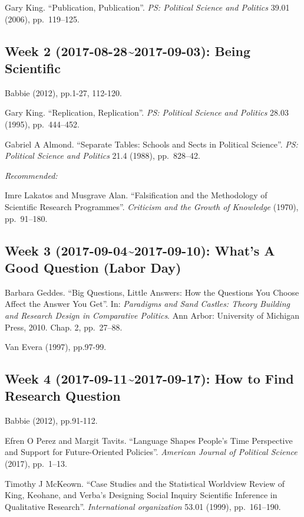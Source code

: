 \documentclass[11pt,]{article}
\begin{document}
Gary King. ``Publication, Publication''.
\emph{PS: Political Science and Politics} 39.01 (2006), pp.~119--125.

\subsection{Week 2 (2017-08-28\textasciitilde{}2017-09-03): Being
Scientific}\label{week-2-2017-08-282017-09-03-being-scientific}

Babbie (2012), pp.1-27, 112-120.

Gary King. ``Replication, Replication''.
\emph{PS: Political Science and Politics} 28.03 (1995), pp.~444--452.

Gabriel A Almond. ``Separate Tables: Schools and Sects in Political
Science''. \emph{PS: Political Science and Politics} 21.4 (1988),
pp.~828--42.

\emph{Recommended:}

Imre Lakatos and Musgrave Alan. ``Falsification and the Methodology of
Scientific Research Programmes''.
\emph{Criticism and the Growth of Knowledge} (1970), pp.~91--180.

\subsection{Week 3 (2017-09-04\textasciitilde{}2017-09-10): What's A
Good Question (Labor
Day)}\label{week-3-2017-09-042017-09-10-whats-a-good-question-labor-day}

Barbara Geddes. ``Big Questions, Little Answers: How the Questions You
Choose Affect the Answer You Get''. In:
\emph{Paradigms and Sand Castles: Theory Building and Research Design in Comparative Politics}.
Ann Arbor: University of Michigan Press, 2010. Chap. 2, pp.~27--88.

Van Evera (1997), pp.97-99.

\subsection{Week 4 (2017-09-11\textasciitilde{}2017-09-17): How to Find
Research
Question}\label{week-4-2017-09-112017-09-17-how-to-find-research-question}

Babbie (2012), pp.91-112.

Efren O Perez and Margit Tavits. ``Language Shapes People's Time
Perspective and Support for Future-Oriented Policies''.
\emph{American Journal of Political Science} (2017), pp.~1--13.

Timothy J McKeown. ``Case Studies and the Statistical Worldview Review
of King, Keohane, and Verba's Designing Social Inquiry Scientific
Inference in Qualitative Research''. \emph{International organization}
53.01 (1999), pp.~161--190.
\end{document}
